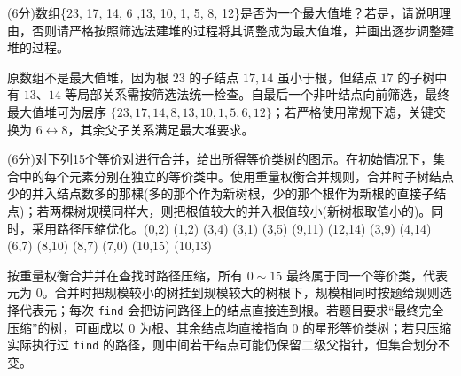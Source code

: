 \begin{question}
(6分)数组\{23, 17, 14, 6 ,13, 10, 1, 5, 8, 12\}是否为一个最大值堆？若是，请说明理由，否则请严格按照筛选法建堆的过程将其调整成为最大值堆，并画出逐步调整建堆的过程。
\begin{solution}
原数组不是最大值堆，因为根 $23$ 的子结点 $17,14$ 虽小于根，但结点 $17$ 的子树中有 $13$、$14$ 等局部关系需按筛选法统一检查。自最后一个非叶结点向前筛选，最终最大值堆可为层序 $\{23,17,14,8,13,10,1,5,6,12\}$；若严格使用常规下滤，关键交换为 $6\leftrightarrow8$，其余父子关系满足最大堆要求。
\end{solution}
\end{question}

\begin{question}
(6分)对下列15个等价对进行合并，给出所得等价类树的图示。在初始情况下，集合中的每个元素分别在独立的等价类中。使用重量权衡合并规则，合并时子树结点少的并入结点数多的那棵(多的那个作为新树根，少的那个根作为新根的直接子结点)；若两棵树规模同样大，则把根值较大的并入根值较小(新树根取值小的)。同时，采用路径压缩优化。(0,2) (1,2) (3,4) (3,1) (3,5) (9,11) (12,14) (3,9) (4,14) (6,7) (8,10) (8,7) (7,0) (10,15) (10,13)
\begin{solution}
按重量权衡合并并在查找时路径压缩，所有 $0\sim15$ 最终属于同一个等价类，代表元为 $0$。合并时把规模较小的树挂到规模较大的树根下，规模相同时按题给规则选择代表元；每次 \texttt{find} 会把访问路径上的结点直接连到根。若题目要求“最终完全压缩”的树，可画成以 $0$ 为根、其余结点均直接指向 $0$ 的星形等价类树；若只压缩实际执行过 \texttt{find} 的路径，则中间若干结点可能仍保留二级父指针，但集合划分不变。
\end{solution}
\end{question}

